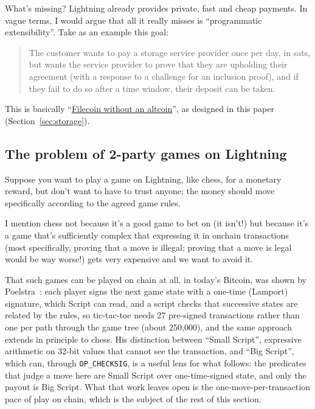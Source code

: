 \documentclass[11pt]{article}
\begin{document}
What's missing? Lightning already provides private, fast and cheap payments. In vague terms, I would argue that all it really misses is ``programmatic extensibility''. Take as an example this goal:

\begin{quote}
The customer wants to pay a storage service provider once per day, in sats, but wants the service provider to prove that they are upholding their agreement (with a response to a challenge for an inclusion proof), and if they fail to do so after a time window, their deposit can be taken.
\end{quote}

This is basically ``\underline{Filecoin without an altcoin}'', as designed in this paper (Section~\ref{sec:storage}).

\subsection{The problem of 2-party games on Lightning}

Suppose you want to play a game on Lightning, like chess, for a monetary reward, but don't want to have to trust anyone; the money should move specifically according to the agreed game rules.

I mention chess not because it's a good game to bet on (it isn't!) but because it's a game that's sufficiently complex that expressing it in onchain transactions (most specifically, proving that a move is illegal; proving that a move is legal would be way worse!) gets very expensive and we want to avoid it.

That such games can be played on chain at all, in today's Bitcoin, was shown by Poelstra~\cite{poelstrastate}: each player signs the next game state with a one-time (Lamport) signature, which Script can read, and a script checks that successive states are related by the rules, so tic-tac-toe needs 27 pre-signed transactions rather than one per path through the game tree (about 250,000), and the same approach extends in principle to chess. His distinction between ``Small Script'', expressive arithmetic on 32-bit values that cannot see the transaction, and ``Big Script'', which can, through \texttt{OP\_CHECKSIG}, is a useful lens for what follows: the predicates that judge a move here are Small Script over one-time-signed state, and only the payout is Big Script. What that work leaves open is the one-move-per-transaction pace of play on chain, which is the subject of the rest of this section.
\end{document}
